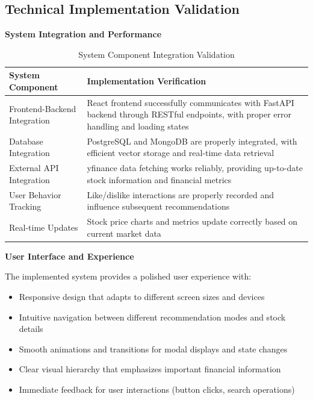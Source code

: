\subsection{Technical Implementation Validation}

\textbf{System Integration and Performance}

\begin{table}[h]
\centering
\caption{System Component Integration Validation}
\begin{tabular}{|p{5cm}|p{8cm}|}
\hline
\textbf{System Component} & \textbf{Implementation Verification} \\
\hline
Frontend-Backend Integration & React frontend successfully communicates with FastAPI backend through RESTful endpoints, with proper error handling and loading states \\
\hline
Database Integration & PostgreSQL and MongoDB are properly integrated, with efficient vector storage and real-time data retrieval \\
\hline
External API Integration & yfinance data fetching works reliably, providing up-to-date stock information and financial metrics \\
\hline
User Behavior Tracking & Like/dislike interactions are properly recorded and influence subsequent recommendations \\
\hline
Real-time Updates & Stock price charts and metrics update correctly based on current market data \\
\hline
\end{tabular}
\end{table}

\textbf{User Interface and Experience}

The implemented system provides a polished user experience with:
\begin{itemize}
\item Responsive design that adapts to different screen sizes and devices
\item Intuitive navigation between different recommendation modes and stock details
\item Smooth animations and transitions for modal displays and state changes
\item Clear visual hierarchy that emphasizes important financial information
\item Immediate feedback for user interactions (button clicks, search operations)
\end{itemize}





